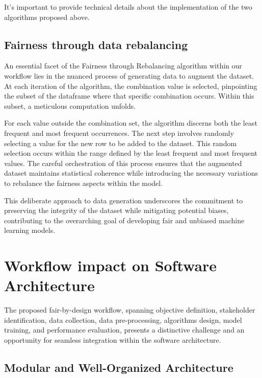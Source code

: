 \documentclass[12pt,a4paper,openright,twoside]{book}
\begin{document}
It's important to provide technical details about the implementation of the two algorithms proposed above.

\subsection{Fairness through data rebalancing}

An essential facet of the Fairness through Rebalancing algorithm within our workflow lies in the nuanced process of generating data to augment the dataset. At each iteration of the algorithm, the combination value is selected, pinpointing the subset of the dataframe where that specific combination occurs. Within this subset, a meticulous computation unfolds.



For each value outside the combination set, the algorithm discerns both the least frequent and most frequent occurrences. The next step involves randomly selecting a value for the new row to be added to the dataset. This random selection occurs within the range defined by the least frequent and most frequent values. The careful orchestration of this process ensures that the augmented dataset maintains statistical coherence while introducing the necessary variations to rebalance the fairness aspects within the model.

This deliberate approach to data generation underscores the commitment to preserving the integrity of the dataset while mitigating potential biases, contributing to the overarching goal of developing fair and unbiased machine learning models.

\section{Workflow impact on Software Architecture}

The proposed fair-by-design workflow, spanning objective definition, stakeholder identification, data collection, data pre-processing, algorithms design, model training, and performance evaluation, presents a distinctive challenge and an opportunity for seamless integration within the software architecture.

\subsection{Modular and Well-Organized Architecture}
\end{document}
